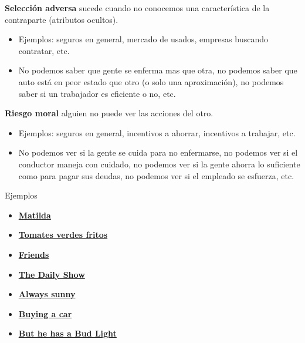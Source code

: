 \documentclass{beamer}
\begin{document}
\begin{frame}
    \textbf{Selección adversa} sucede cuando no conocemos una característica de la contraparte (atributos ocultos).
    \begin{itemize}
        \item Ejemplos: seguros en general, mercado de usados, empresas buscando contratar, etc.  
        \item No podemos saber que gente se enferma mas que otra, no podemos saber que auto está en peor estado que otro (o solo una aproximación), no podemos saber si un trabajador es eficiente o no, etc.
    \end{itemize}
    \textbf{Riesgo moral} alguien no puede ver las acciones del otro.
    \begin{itemize}
        \item Ejemplos: seguros en general, incentivos a ahorrar, incentivos a trabajar, etc.
        \item No podemos ver si la gente se cuida para no enfermarse, no podemos ver si el conductor maneja con cuidado, no podemos ver si la gente ahorra lo suficiente como para pagar sus deudas, no podemos ver si el empleado se esfuerza, etc.
    \end{itemize}
\end{frame}

\begin{frame}{Ejemplos}
    \begin{itemize}
    \item \href{https://www.youtube.com/watch?v=qlg0qakJhKU}{\textbf{Matilda}}
    \item \href{https://www.youtube.com/watch?v=akA8co61He4}{\textbf{Tomates verdes fritos}}
    \item \href{https://www.youtube.com/watch?v=X8BPfLhH6MA}{\textbf{Friends}}
    \item \href{https://videos.criticalcommons.org/media/encoded/16/jtierney86/43ba1b1ac3e94df3974f987cc912ae_Hxgbfl1.mp4}{\textbf{The Daily Show}}
    \item \href{http://videos.criticalcommons.org/transcoded/http/www.criticalcommons.org/Members/JJWooten/clips/always-sunny-paying-for-care/video_file/mp4-high/always-sunny-cost-of-care-mp4.mp4}{\textbf{Always sunny}}
    \item \href{https://www.youtube.com/watch?v=SrPu-xGrKrk}{\textbf{Buying a car}}
    \item \href{https://www.youtube.com/watch?v=ZZq0ShjEd-E}{\textbf{But he has a Bud Light}}
    \end{itemize}
\end{frame}
    
\end{document}
